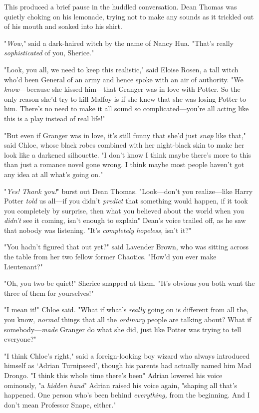 This produced a brief pause in the huddled conversation. Dean Thomas was
quietly choking on his lemonade, trying not to make any sounds as it trickled
out of his mouth and soaked into his shirt.

"\emph{Wow,}" said a dark-haired witch by the name of Nancy Hua. "That's
really{\el} \emph{sophisticated} of you, Sherice."

"Look, you all, we need to keep this realistic," said Eloise Rosen, a tall
witch who'd been General of an army and hence spoke with an air of authority.
"We \emph{know}—because she kissed him—that Granger was in love with
Potter. So the only reason she'd try to kill Malfoy is if she knew that she was
losing Potter to him. There's no need to make it all sound so
complicated—you're all acting like this is a play instead of real life!"

"But even if Granger was in love, it's still funny that she'd just \emph{snap}
like that," said Chloe, whose black robes combined with her night-black skin to
make her look like a darkened silhouette. "I don't know{\el} I think maybe
there's more to this than just a romance novel gone wrong. I think maybe most
people haven't got any idea at all what's going on."

"\emph{Yes! Thank you!}" burst out Dean Thomas. "Look—don't you
realize—like Harry Potter \emph{told} us all—if you didn't \emph{predict}
that something would happen, if it took you completely by surprise, then what
you believed about the world when you \emph{didn't} see it coming, isn't enough
to explain{\el}" Dean's voice trailed off, as he saw that nobody was
listening. "It's \emph{completely hopeless,} isn't it?"

"You hadn't figured that out yet?" said Lavender Brown, who was sitting across
the table from her two fellow former Chaotics. "How'd you ever make Lieutenant?"

"Oh, you two be quiet!" Sherice snapped at them. "It's obvious you both want
the three of them for yourselves!"

"I mean it!" Chloe said. "What if what's \emph{really} going on is different
from all the, you know, \emph{normal} things that all the \emph{ordinary}
people are talking about? What if somebody—\emph{made} Granger do what she
did, just like Potter was trying to tell everyone?"

"I think Chloe's right," said a foreign-looking boy wizard who always
introduced himself as `Adrian Turnipseed', though his parents had actually
named him Mad Drongo. "I think this whole time there's been{\el}" Adrian
lowered his voice ominously, "{\el}a \emph{hidden hand}{\el}" Adrian
raised his voice again, "shaping all that's happened. One person who's been
behind \emph{everything,} from the beginning. And I don't mean Professor Snape,
either."

